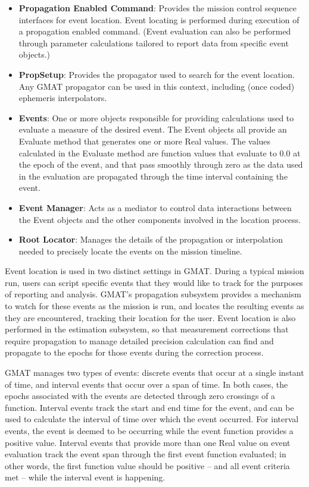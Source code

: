 \begin{itemize}
\item \textbf{Propagation Enabled Command}:  Provides the mission control sequence interfaces for event location.  Event locating is performed during execution of a propagation enabled command.  (Event evaluation can also be performed through parameter calculations tailored to report data from specific event objects.)
\item \textbf{PropSetup}:  Provides the propagator used to search for the event location.  Any GMAT propagator can be used in this context, including (once coded) ephemeris interpolators.
\item \textbf{Events}:  One or more objects responsible for providing calculations used to evaluate a measure of the desired event.  The Event objects all provide an Evaluate method that generates one or more Real values.  The values calculated in the Evaluate method are function values that evaluate to 0.0 at the epoch of the event, and that pass smoothly through zero as the data used in the evaluation are propagated through the time interval containing the event.
\item \textbf{Event Manager}: Acts as a mediator to control data interactions between the Event objects and the other components involved in the location process.
\item \textbf{Root Locator}: Manages the details of the propagation or interpolation needed to precisely locate the events on the mission timeline.
\end{itemize}

Event location is used in two distinct settings in GMAT.  During a typical mission run, users can script specific events that they would like to track for the purposes of reporting and analysis.  GMAT's propagation subsystem provides a mechanism to watch for these events as the mission is run, and locates the resulting events as they are encountered, tracking their location for the user.  Event location is also performed in the estimation subsystem, so that measurement corrections that require propagation to manage detailed precision calculation can find and propagate to the epochs for those events during the correction process.

GMAT manages two types of events: discrete events that occur at a single instant of time, and interval events that occur over a span of time.  In both cases, the epochs associated with the events are detected through zero crossings of a function.  Interval events track the start and end time for the event, and can be used to calculate the interval of time over which the event occurred.  For interval events, the event is deemed to be occurring while the event function provides a positive value.  Interval events that provide more than one Real value on event evaluation track the event span through the first event function evaluated; in other words, the first function value should be positive -- and all event criteria met -- while the interval event is happening.

